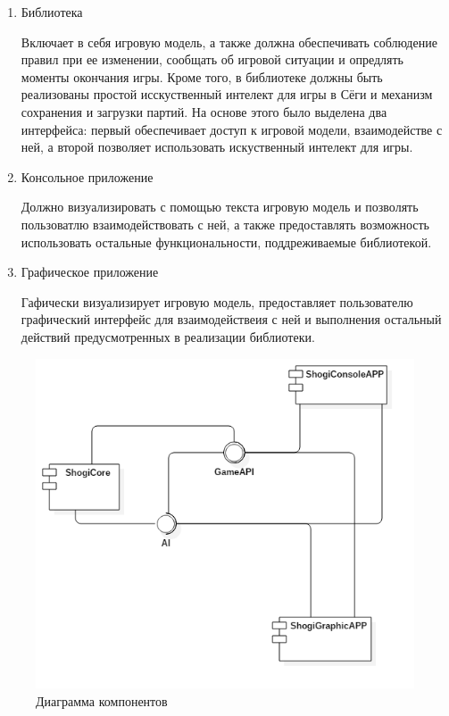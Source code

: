 \begin{enumerate}
	\item Библиотека
	
	 Включает в себя игровую модель, а также должна обеспечивать соблюдение правил при   	 ее изменении, сообщать об игровой ситуации и опредлять моменты окончания игры. 			 Кроме того, в библиотеке должны быть реализованы простой исскуственный интелект для      	 игры в Сёги и механизм сохранения и загрузки партий. На основе этого было выделена      	 два интерфейса: первый обеспечивает доступ к игровой модели, взаимодействе с ней, а        	 второй позволяет использовать искуственный интелект для игры.

	\item Консольное приложение
	
	Должно визуализировать с помощью текста игровую модель и позволять пользоватлю 				взаимодействовать с ней, а также предоставлять возможность использовать остальные 			функциональности, поддреживаемые библиотекой.
	
	\item Графическое приложение 

	Гафически визуализирует игровую модель, предоставляет пользователю графический интерфейс для взаимодействеия с ней и выполнения остальный действий предусмотренных в реализации библиотеки. 
\end{enumerate}

\begin{figure}[H]
	\begin{center}
		\includegraphics[scale=0.7]{../diagrams/ComponentDiagram1.png}
		\caption{Диаграмма компонентов}
		\label{pic:components}
	\end{center}
\end{figure}

